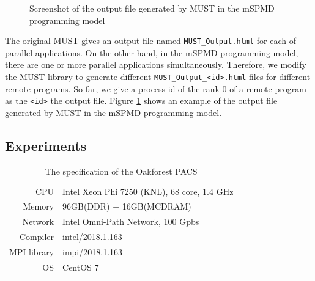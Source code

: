 \documentclass[graybox]{svmult}
\begin{document}
\begin{figure}[t]
\begin{center}
\caption{Screenshot of the output file generated by MUST in the mSPMD programming model}
\label{figure:myx-result-screenshot}
\end{center}
\end{figure}

The original MUST gives an output file named {\tt MUST\_Output.html} for each of parallel applications. 
On the other hand, in the mSPMD programming model, there are one or more parallel applications simultaneously. Therefore, we modify the MUST library to generate different {\tt MUST\_Output\_<id>.html} files for different remote programs. So far, we give a process id of the rank-0 of a remote program as the {\tt <id>} the output file. Figure \ref{figure:myx-result-screenshot} shows an example of the output file generated by MUST in the mSPMD programming model. 

\subsection{Experiments}

\begin{table}[t]
\begin{center}
 \caption{The specification of the Oakforest PACS}
 \label{tb:ofp}
\begin{tabular}[t]{rl}\hline\hline
CPU & Intel Xeon Phi 7250 (KNL), 68 core, 1.4 GHz\\
Memory & 96GB(DDR) + 16GB(MCDRAM)\\
Network  & Intel Omni-Path Network, 100 Gpbs\\
Compiler & intel/2018.1.163\\
MPI library & impi/2018.1.163\\
OS & CentOS 7\\\hline
\end{tabular}
\end{center}
\end{table}
\end{document}
